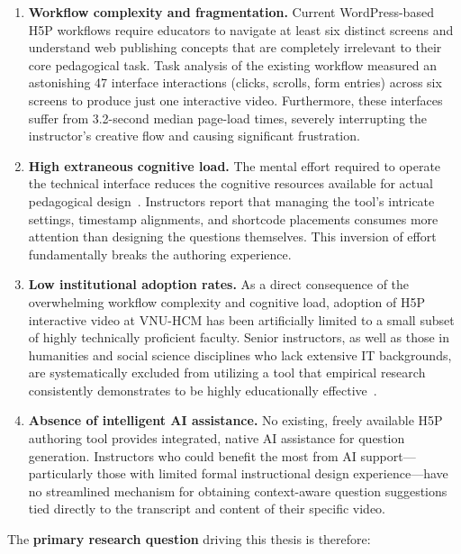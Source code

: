 \begin{enumerate}
  \item \textbf{Workflow complexity and fragmentation.} Current WordPress-based H5P workflows require educators to navigate at least six distinct screens and understand web publishing concepts that are completely irrelevant to their core pedagogical task. Task analysis of the existing workflow measured an astonishing 47 interface interactions (clicks, scrolls, form entries) across six screens to produce just one interactive video. Furthermore, these interfaces suffer from 3.2-second median page-load times, severely interrupting the instructor's creative flow and causing significant frustration.
  
  \item \textbf{High extraneous cognitive load.} The mental effort required to operate the technical interface reduces the cognitive resources available for actual pedagogical design~\cite{chandler1991,mayer2009}. Instructors report that managing the tool's intricate settings, timestamp alignments, and shortcode placements consumes more attention than designing the questions themselves. This inversion of effort fundamentally breaks the authoring experience.
  
  \item \textbf{Low institutional adoption rates.} As a direct consequence of the overwhelming workflow complexity and cognitive load, adoption of H5P interactive video at VNU-HCM has been artificially limited to a small subset of highly technically proficient faculty. Senior instructors, as well as those in humanities and social science disciplines who lack extensive IT backgrounds, are systematically excluded from utilizing a tool that empirical research consistently demonstrates to be highly educationally effective~\cite{davis1989,hadullo2017}.
  
  \item \textbf{Absence of intelligent AI assistance.} No existing, freely available H5P authoring tool provides integrated, native AI assistance for question generation. Instructors who could benefit the most from AI support---particularly those with limited formal instructional design experience---have no streamlined mechanism for obtaining context-aware question suggestions tied directly to the transcript and content of their specific video.
\end{enumerate}

The \textbf{primary research question} driving this thesis is therefore:

